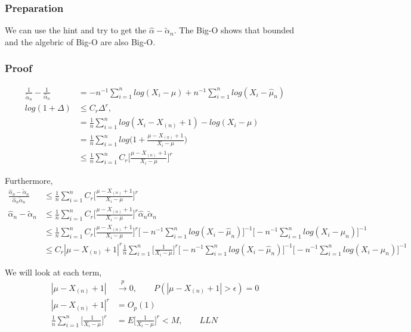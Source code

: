 \documentclass[11pt]{article} %
\begin{document}
	
\subsubsection{Preparation}	
We can use the hint and try to get the $\hat{\alpha} - \tilde{\alpha}_n$. The Big-O shows that bounded and the algebric of Big-O are also Big-O. 



\subsubsection{Proof}	

 \begin{align*}
 	\frac{1}{ \tilde{\alpha}_n} - \frac{1}{\hat{\alpha}_n} &= -n^{-1} \sum_{i=1}^n log(X_i - \mu)  + n^{-1} \sum_{i=1}^n log(X_i - \hat{\mu}_n)  \\
	log(1+ \Delta) & \leq C_r \Delta^r, \\
	&= \frac{1}{n} \sum_{i=1}^n log(X_i - X_{(n)} + 1) - log(X_i - \mu)  \\
	&= \frac{1}{n} \sum_{i=1}^n log \Big(1+ \frac{\mu-X_{(n)} + 1}{X_i - \mu} \Big) \\
	& \leq \frac{1}{n} \sum_{i=1}^n C_r \Big[ \frac{\mu - X_{(n)} + 1}{X_i - \mu} \Big]^r 
 \end{align*}  

Furthermore,
\begin{align*}
	\frac{\hat{\alpha}_n - \tilde{\alpha}_n}{\hat{\alpha}_n \tilde{\alpha}_n} & \leq \frac{1}{n} \sum_{i=1}^n C_r \Big[ \frac{\mu - X_{(n)} + 1}{X_i - \mu} \Big]^r\\
	\hat{\alpha}_n - \tilde{\alpha}_n & \leq \frac{1}{n} \sum_{i=1}^n C_r \Big[ \frac{\mu - X_{(n)} + 1}{X_i - \mu} \Big]^r \hat{\alpha}_n \tilde{\alpha}_n \\
	& \leq \frac{1}{n} \sum_{i=1}^n C_r \Big[ \frac{\mu - X_{(n)} + 1}{X_i - \mu} \Big]^r \Big[ -n^{-1} \sum_{i=1}^n log(X_i - \hat{\mu}_n) \Big]^{-1} \Big[ -n^{-1} \sum_{i=1}^n log(X_i - \mu_n) \Big]^{-1} \\
	& \leq C_r  |\mu - X_{(n)} + 1|^r \frac{1}{n} \sum_{i=1}^n \Big[ \frac{1}{X_i - \mu} \Big]^r \Big[ -n^{-1} \sum_{i=1}^n log(X_i - \hat{\mu}_n) \Big]^{-1} \Big[ -n^{-1} \sum_{i=1}^n log(X_i - \mu_n) \Big]^{-1}
\end{align*} 

We will look at each term,
 \begin{align*}
 	|\mu - X_{(n)} + 1| & \xrightarrow {p} 0, \qquad P(|\mu - X_{(n)} + 1| > \epsilon) = 0 \\
	|\mu - X_{(n)} + 1|^r &= O_p(1) \\
	\frac{1}{n} \sum_{i=1}^n \Big[ \frac{1}{X_i - \mu} \Big]^r &= E \Big[ \frac{1}{X_i - \mu} \Big]^r < M, \qquad LLN \\
\end{align*}  
		
\end{document}
